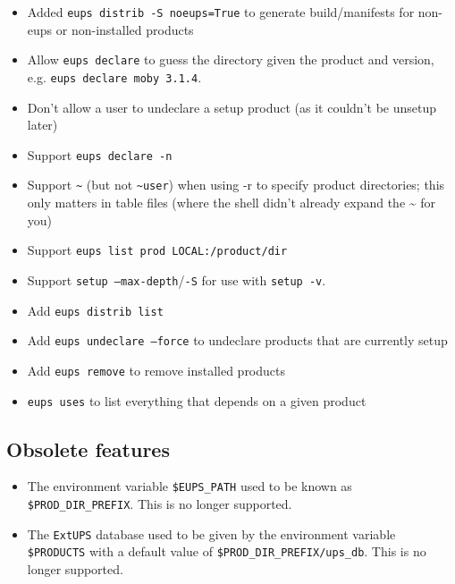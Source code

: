 \documentclass{article}
\newcommand{\code}[1]{\texttt{#1}}
\newcommand{\eups}{\code{ExtUPS}\xspace}
\begin{document}
\begin{itemize}
  \item
    Added \code{eups distrib -S noeups=True} to generate build/manifests for non-eups or non-installed products

  \item
    Allow \code{eups declare} to guess the directory given the product and version,
    e.g. \code{eups declare moby 3.1.4}.

  \item
    Don't allow a user to undeclare a setup product (as it couldn't be unsetup later)

  \item
    Support \code{eups declare -n}

  \item
    Support \code{\~} (but not \code{\~{}user}) when using -r to specify product directories;
    this only matters in table files (where the shell didn't already expand
    the \~{} for you)

  \item
    Support \code{eups list prod LOCAL:/product/dir}

  \item
    Support \code{setup --max-depth}/\code{-S} for use with \code{setup -v}.

  \item
    Add \code{eups distrib list}

  \item
    Add \code{eups undeclare --force} to undeclare products that are currently
    setup

  \item
    Add \code{eups remove} to remove installed products

  \item \code{eups uses} to list everything that depends on a given product

\end{itemize}

\subsection{Obsolete features}

\begin{itemize}
  \item The environment variable \code{\$EUPS\_PATH} used to be known
  as \code{\$PROD\_DIR\_PREFIX}. This is no longer supported.

  \item The \eups database used to be given by the environment variable \code{\$PRODUCTS}
    with a default value of \code{\$PROD\_DIR\_PREFIX/ups\_db}. This is no longer supported.
\end{itemize}
\end{document}
